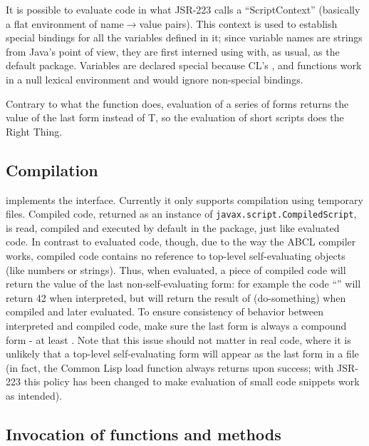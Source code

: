 \documentclass[10pt]{book}
\begin{document}
It is possible to evaluate code in what JSR-223 calls a
``ScriptContext'' (basically a flat environment of name$\rightarrow$value
pairs). This context is used to establish special bindings for all the
variables defined in it; since variable names are strings from Java's
point of view, they are first interned using  with, as
usual,  as the default package. Variables are declared
special because CL's ,  and 
functions work in a null lexical environment and would ignore
non-special bindings.

Contrary to what the function  does, evaluation of a series
of forms returns the value of the last form instead of T, so the
evaluation of short scripts does the Right Thing.

\subsection{Compilation}

 implements the 
interface. Currently it only supports compilation using temporary
files. Compiled code, returned as an instance of
\texttt{javax.script.CompiledScript}, is read, compiled and executed
by default in the  package, just like evaluated
code.  In contrast to evaluated code, though, due to the way the
\textsc{ABCL} compiler works, compiled code contains no reference to
top-level self-evaluating objects (like numbers or strings). Thus,
when evaluated, a piece of compiled code will return the value of the
last non-self-evaluating form: for example the code
``'' will return 42 when interpreted, but will
return the result of (do-something) when compiled and later
evaluated. To ensure consistency of behavior between interpreted and
compiled code, make sure the last form is always a compound form - at
least . Note that this issue
should not matter in real code, where it is unlikely that a top-level
self-evaluating form will appear as the last form in a file (in fact,
the Common Lisp load function always returns  upon success;
with \textsc{JSR-223} this policy has been changed to make evaluation
of small code snippets work as intended).

\subsection{Invocation of functions and methods}
\end{document}
